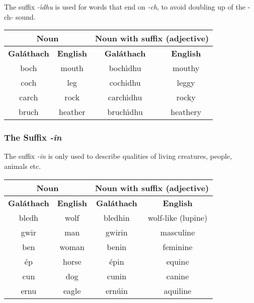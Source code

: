 The suffix \textit{-\'{\i}dhu} is used for words that end on \textit{-ch}, to avoid doubling up of the -ch- sound.
\begin{table}[H]
\centering
\begin{tabular}{cccc}
  \toprule
  \multicolumn{2}{c}{\textbf{Noun}} & \multicolumn{2}{c}{\textbf{Noun with suffix (adjective)}}\\
  \midrule
  \textbf{Gal\'{a}thach} & \textbf{English} & \textbf{Gal\'{a}thach} & \textbf{English}\\
  \cmidrule(lr){1-1}\cmidrule(lr){2-2}\cmidrule(lr){3-3}\cmidrule(lr){4-4}
  boch & mouth & boch\'{\i}dhu & mouthy\\
  coch & leg & cochidhu & leggy\\
  carch & rock & carch\'{\i}dhu & rocky\\
  bruch & heather & bruch\'{\i}dhu & heathery\\
  \bottomrule
\end{tabular}
\label{examples_suffix_iidhu}
\end{table}

\subsubsection{The Suffix \textit{-in}}

The suffix \textit{-in} is only used to describe qualities of living creatures, people, animals etc.
\begin{table}[H]
\centering
\begin{tabular}{cccc}
  \toprule
  \multicolumn{2}{c}{\textbf{Noun}} & \multicolumn{2}{c}{\textbf{Noun with suffix (adjective)}}\\
  \midrule
  \textbf{Gal\'{a}thach} & \textbf{English} & \textbf{Gal\'{a}thach} & \textbf{English}\\
  \cmidrule(lr){1-1}\cmidrule(lr){2-2}\cmidrule(lr){3-3}\cmidrule(lr){4-4}
  bledh & wolf & bledhin & wolf-like (lupine)\\
  gwir & man & gwirin & masculine\\
  ben & woman & benin & feminine\\
  \'{e}p & horse & \'{e}pin & equine\\
  cun & dog & cunin & canine\\
  ernu & eagle & ern\'{u}in & aquiline\\
  \bottomrule
\end{tabular}
\label{examples_suffix_in}
\end{table}


